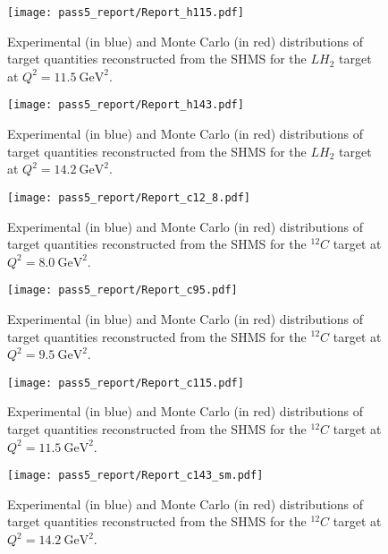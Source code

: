 \begin{figure}[!h]
    \centering
    \texttt{[image: pass5\_report/Report\_h115.pdf]}
    \caption{
            Experimental (in blue) and Monte Carlo (in red) distributions of
            target quantities reconstructed from the SHMS for
            the $LH_2$ target at $Q^2=\SI{11.5}{\giga\electronvolt\squared}$.
            }
    \label{fig:Report_h115.pdf_pg2}
\end{figure}


\begin{figure}[!h]
    \centering
    \texttt{[image: pass5\_report/Report\_h143.pdf]}
    \caption{
            Experimental (in blue) and Monte Carlo (in red) distributions of
            target quantities reconstructed from the SHMS for
            the $LH_2$ target at $Q^2=\SI{14.2}{\giga\electronvolt\squared}$.
            }
    \label{fig:Report_h143.pdf_pg2}
\end{figure}


\begin{figure}[!h]
    \centering
    \texttt{[image: pass5\_report/Report\_c12\_8.pdf]}
    \caption{
            Experimental (in blue) and Monte Carlo (in red) distributions of
            target quantities reconstructed from the SHMS for
            the ${}^{12}C$ target at $Q^2=\SI{8.0}{\giga\electronvolt\squared}$.
            }
    \label{fig:Report_c12_8.pdf_pg2}
\end{figure}


\begin{figure}[!h]
    \centering
    \texttt{[image: pass5\_report/Report\_c95.pdf]}
    \caption{
            Experimental (in blue) and Monte Carlo (in red) distributions of
            target quantities reconstructed from the SHMS for
            the ${}^{12}C$ target at $Q^2=\SI{9.5}{\giga\electronvolt\squared}$.
            }
    \label{fig:Report_c95.pdf_pg2}
\end{figure}


\begin{figure}[!h]
    \centering
    \texttt{[image: pass5\_report/Report\_c115.pdf]}
    \caption{
            Experimental (in blue) and Monte Carlo (in red) distributions of
            target quantities reconstructed from the SHMS for
            the ${}^{12}C$ target at $Q^2=\SI{11.5}{\giga\electronvolt\squared}$.
            }
    \label{fig:Report_c115.pdf_pg2}
\end{figure}


\begin{figure}[!h]
    \centering
    \texttt{[image: pass5\_report/Report\_c143\_sm.pdf]}
    \caption{
            Experimental (in blue) and Monte Carlo (in red) distributions of
            target quantities reconstructed from the SHMS for
            the ${}^{12}C$ target at $Q^2=\SI{14.2}{\giga\electronvolt\squared}$.
            }
    \label{fig:Report_c143_sm.pdf_pg2}
\end{figure}
